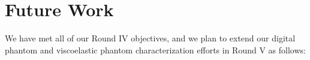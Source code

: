 \section{Future Work}\label{sect:future_work}

We have met all of our Round IV objectives, and we plan to extend our digital
phantom and viscoelastic phantom characterization efforts in Round V as
follows:
